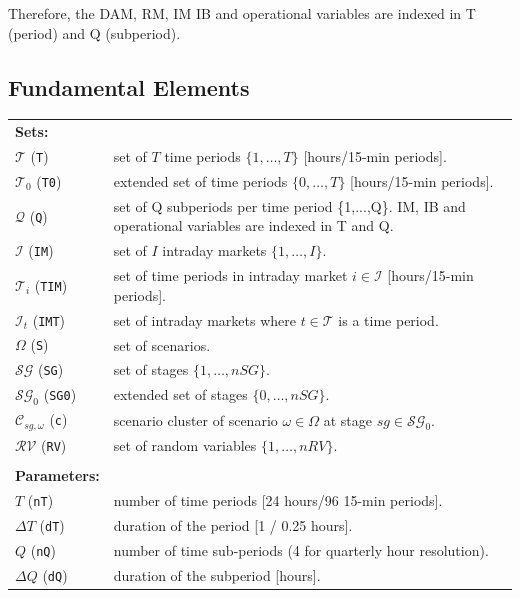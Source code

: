 Therefore, the DAM, RM, IM IB and operational variables are indexed in T (period) and Q (subperiod).

\subsection{Fundamental Elements}
\label{SEC:FundamentalElements2}

\begin{tabularx}{\textwidth}{l X}
    \textbf{Sets:} \\
    $\mathcal{T}$ (\texttt{T}) & set of $T$ time periods $\{ 1, \dots, T \}$ [hours/15-min periods]. \\
    $\mathcal{T}_0$ (\texttt{T0}) & extended set of time periods $\{ 0, \dots, T \}$ [hours/15-min periods]. \\     
    $\mathcal{Q}$ (\texttt{Q}) & set of Q subperiods per time period \{1,...,Q\}. IM, IB and operational variables are indexed in T and Q. \\
    $\mathcal{I}$ (\texttt{IM}) & set of $I$ intraday markets $\{1, \dots, I \}$. \\    
    $\mathcal{T}_i$ (\texttt{TIM}) & set of time periods in intraday market $i \in \mathcal{I}$ [hours/15-min periods]. \\
    $\mathcal{I}_t$ (\texttt{IMT}) & set of intraday markets where $t \in \mathcal{T}$ is a time period. \\    
    $\Omega$ (\texttt{S}) & set of scenarios. \\
    $\mathcal{SG}$ (\texttt{SG}) & set of stages $\{1, \dots, nSG \}$. \\
    $\mathcal{SG}_0$ (\texttt{SG0}) & extended set of stages $\{0, \dots, nSG \}$. \\     
    $\mathcal{C}_{sg, \omega}$ (\texttt{c}) & scenario cluster of scenario $\omega \in \Omega$ at stage $sg \in \mathcal{SG}_0$. \\
    $\mathcal{RV}$ (\texttt{RV}) & set of random variables $\{1, \dots, nRV \}$. \\   
    \\
    \textbf{Parameters:} \\
    $T$ (\texttt{nT}) & number of time periods [24 hours/96 15-min periods]. \\
    $\Delta T$ (\texttt{dT}) & duration of the period [1 / 0.25 hours]. \\
    $Q$ (\texttt{nQ}) & number of time sub-periods (4 for quarterly hour resolution). \\
    $\Delta Q$ (\texttt{dQ}) & duration of the subperiod [hours]. \\

\end{tabularx}
